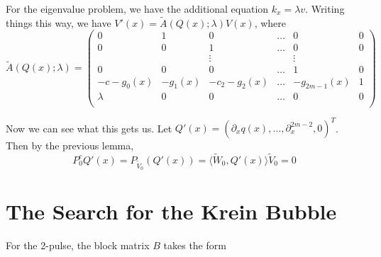 \documentclass[thesis.tex]{subfiles}
\begin{document}
For the eigenvalue problem, we have the additional equation $k_x = \lambda v$. Writing things this way, we have
$V'(x) = \tilde{A}(Q(x); \lambda)V(x)$, where
\[
\tilde{A}(Q(x); \lambda) = 
\begin{pmatrix}
0 & 1 & 0 & \dots & 0 & 0\\
0 & 0 & 1 & \dots & 0 & 0\\
&& \vdots && \vdots \\
0 & 0 & 0 & \dots & 1 & 0\\
-c - g_0(x) & -g_1(x) & -c_2 - g_2(x) & \dots 
& -g_{2m-1}(x) & 1 \\
\lambda & 0 & 0 & \dots & 0 & 0 \\
\end{pmatrix}
\]

Now we can see what this gets us. Let $Q'(x) = (\partial_x q(x), \dots, \partial_x^{2m-2}, 0)^T$. Then by the previous lemma,
\[
P^c_0 Q'(x) = P_{\tilde{V}_0}(Q'(x)) = \langle \tilde{W}_0, Q'(x) \rangle \tilde{V}_0 = 0
\]


\section{The Search for the Krein Bubble}

For the 2-pulse, the block matrix $B$ takes the form
\end{document}
